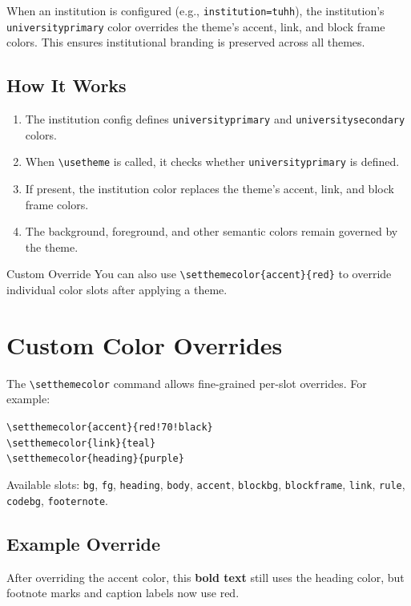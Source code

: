 \documentclass[
    language=english,
    doctype=article,
    institution=none,
    titlestyle=simple,
]{../../omnilatex}
\begin{document}

When an institution is configured (e.g., \texttt{institution=tuhh}), the
institution's \texttt{universityprimary} color overrides the theme's accent,
link, and block frame colors. This ensures institutional branding is preserved
across all themes.

\subsection{How It Works}

\begin{enumerate}
    \item The institution config defines \texttt{universityprimary} and
          \texttt{universitysecondary} colors.
    \item When \texttt{\textbackslash usetheme} is called, it checks whether
          \texttt{universityprimary} is defined.
    \item If present, the institution color replaces the theme's accent,
          link, and block frame colors.
    \item The background, foreground, and other semantic colors remain
          governed by the theme.
\end{enumerate}

\begin{block}{Custom Override}
    You can also use \texttt{\textbackslash setthemecolor\{accent\}\{red\}}
    to override individual color slots after applying a theme.
\end{block}

\newpage


\section{Custom Color Overrides}


The \texttt{\textbackslash setthemecolor} command allows fine-grained
per-slot overrides. For example:

\begin{center}
    \texttt{\textbackslash setthemecolor\{accent\}\{red!70!black\}}\\[6pt]
    \texttt{\textbackslash setthemecolor\{link\}\{teal\}}\\[6pt]
    \texttt{\textbackslash setthemecolor\{heading\}\{purple\}}
\end{center}

Available slots: \texttt{bg}, \texttt{fg}, \texttt{heading}, \texttt{body},
\texttt{accent}, \texttt{blockbg}, \texttt{blockframe}, \texttt{link},
\texttt{rule}, \texttt{codebg}, \texttt{footernote}.

\subsection{Example Override}


After overriding the accent color, this \textbf{bold text} still uses the
heading color, but footnote marks and caption labels now use red.
\end{document}
